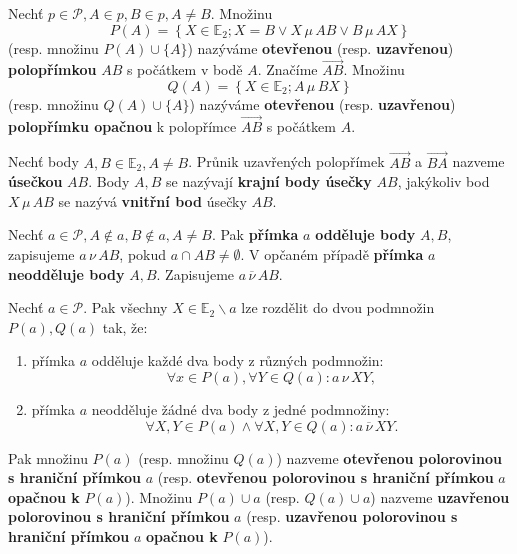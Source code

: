 \begin{definition}
  Nechť $p\in \mathscr P,A \in p, B \in p, A \ne B.$ Množinu
  \[
    P(A)=\left \{ X\in \mathbb E_2; X=B \lor X\,\mu\, AB \lor B\, \mu\, AX \right \}
  \]
  (resp. množinu $P(A)\cup \{A\}$) nazýváme \textbf{otevřenou} (resp. \textbf{uzavřenou}) \textbf{polopřímkou} $AB$ s počátkem v bodě $A$. Značíme $\overrightarrow{AB}$. Množinu
  \[
    Q(A)=\left \{ X\in \mathbb E_2; A\,\mu\, BX \right \}
  \]
  (resp. množinu $Q(A)\cup \{A\}$) nazýváme \textbf{otevřenou} (resp. \textbf{uzavřenou}) \textbf{polopřímku opačnou} k polopřímce $\overrightarrow{AB}$ s počátkem $A$.
\end{definition}

\begin{definition}
  Nechť body $A,B\in \mathbb E_2, A\ne B$. Průnik uzavřených polopřímek $\overrightarrow{AB}$ a $\overrightarrow{BA}$ nazveme \textbf{úsečkou} $AB$.
  Body $A,B$ se nazývají \textbf{krajní body úsečky} $AB$, jakýkoliv bod $X\,\mu \, AB$ se nazývá \textbf{vnitřní bod} úsečky $AB$.
\end{definition}

\begin{definition}
Nechť $a\in \mathscr P, A\notin a, B\notin a, A\ne B.$ Pak \textbf{přímka} $a$ \textbf{odděluje body} $A,B$, zapisujeme $a\, \nu\, AB$, pokud $a \cap AB \neq \emptyset$. V opčaném případě \textbf{přímka} $a$ \textbf{neodděluje body} $A,B$. Zapisujeme $a\, \overline \nu \,AB.$
\end{definition}

\begin{definition}
  Nechť $a \in \mathscr P$. Pak všechny $X\in \mathbb E_2 \smallsetminus a$ lze rozdělit do dvou podmnožin $P(a), Q(a)$ tak, že:
  \begin{enumerate}[$i.$]
    \item přímka $a$ odděluje každé dva body z různých podmnožin:
      \[
        \forall x \in P(a), \forall Y \in Q(a): a \, \nu \, XY,
      \]
    \item přímka $a$ neodděluje žádné dva body z jedné podmnožiny:
      \[
        \forall X, Y \in P(a) \land \forall X,Y \in Q(a): a \,\overline \nu\, XY.
      \]
  \end{enumerate}
  Pak množinu $P(a)$ (resp. množinu $Q(a)$) nazveme \textbf{otevřenou polorovinou s hraniční přímkou} $a$ (resp. \textbf{otevřenou polorovinou s hraniční přímkou} $a$ \textbf{opačnou k} $P(a)$). Množinu $P(a)\cup a$ (resp. $Q(a) \cup a$) nazveme \textbf{uzavřenou polorovinou s hraniční přímkou} $a$ (resp. \textbf{uzavřenou polorovinou s hraniční přímkou} $a$ \textbf{opačnou k} $P(a)$).
\end{definition}

